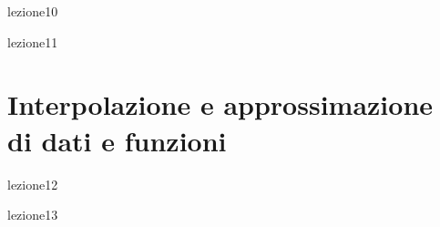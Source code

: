 \documentclass[12pt,a4paper,headings=optiontohead]{scrbook}
\begin{document}
\newpage
{lezione10}


\newpage
{lezione11}


\newpage

\chapter{Interpolazione e approssimazione di dati e funzioni}

{lezione12}


\newpage
{lezione13}
\end{document}
